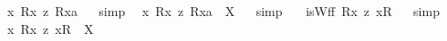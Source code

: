 \begin{isabellebody}
{\isafoldproof}%
%
\isadelimproof
%
\endisadelimproof
\isanewline
\isanewline
{}\isamarkupfalse%
\ {\isachardoublequoteopen}{\isacharbrackleft}{\isacharless}{\isasymlambda}x{\isachardot}\ {\isacharless}R{}{\isasymbullet}{\isachardot}x{\isachardot}{\isachargreater}\ {\isasymrightarrow}\isactrlsup z\ {\isacharless}R{}{\isasymbullet}{\isachardot}x{\isachardot}{\isachargreater}{\isacharparenright}{\isasymbullet}a{\isachargreater}{\isacharbrackright}{\isachardoublequoteclose}%
\isadelimproof
\ %
\endisadelimproof
%
\isatagproof
{}\isamarkupfalse%
\ {\isacharparenleft}simp{\isacharparenright}\ \isamarkupfalse%
%
\endisatagproof
{\isafoldproof}%
%
\isadelimproof
%
\endisadelimproof
\isanewline
{}\isamarkupfalse%
\ {\isachardoublequoteopen}{\isacharless}{\isasymlambda}x{\isachardot}\ {\isacharless}R{}{\isasymbullet}{\isachardot}x{\isachardot}{\isachargreater}\ {\isasymrightarrow}\isactrlsup z\ {\isacharless}R{}{\isasymbullet}{\isachardot}x{\isachardot}{\isachargreater}{\isacharparenright}{\isasymbullet}a{\isachargreater}\ {\isacharequal}\ X{\isachardoublequoteclose}%
\isadelimproof
\ %
\endisadelimproof
%
\isatagproof
{}\isamarkupfalse%
\ {\isacharparenleft}simp{\isacharparenright}\ \isamarkupfalse%
%
\endisatagproof
{\isafoldproof}%
%
\isadelimproof
%
\endisadelimproof
\isanewline
\isanewline
{}\isamarkupfalse%
\ {\isachardoublequoteopen}{\isasymnot}\ isWff\ {\isacharparenleft}{\isacharless}R{}{\isasymbullet}{\isachardot}x{\isachardot}{\isachargreater}\ {\isasymrightarrow}\isactrlsup z\ {\isacharless}{\isachardot}x{\isachardot}{\isasymcirc}R{}{\isachargreater}{\isacharparenright}{\isachardoublequoteclose}%
\isadelimproof
\ %
\endisadelimproof
%
\isatagproof
{}\isamarkupfalse%
\ {\isacharparenleft}simp{\isacharparenright}\ \isamarkupfalse%
%
\endisatagproof
{\isafoldproof}%
%
\isadelimproof
%
\endisadelimproof
\isanewline
{}\isamarkupfalse%
\ {\isachardoublequoteopen}{\isasymlambda}x{\isachardot}\ {\isacharless}R{}{\isasymbullet}{\isachardot}x{\isachardot}{\isachargreater}\ {\isasymrightarrow}\isactrlsup z\ {\isacharless}{\isachardot}x{\isachardot}{\isasymcirc}R{}{\isachargreater}{\isacharparenright}\ {\isacharequal}\ X{\isachardoublequoteclose}%

\end{isabellebody}
